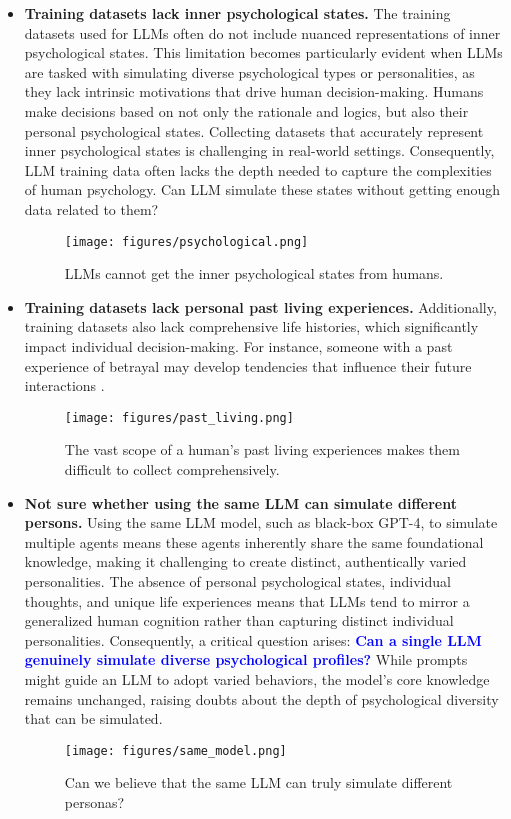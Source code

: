 \begin{itemize}
\item \textbf{Training datasets lack inner psychological states.} The training datasets used for LLMs often do not include nuanced representations of inner psychological states. This limitation becomes particularly evident when LLMs are tasked with simulating diverse psychological types or personalities, as they lack intrinsic motivations that drive human decision-making. Humans make decisions based on not only the rationale and logics, but also their personal psychological states. Collecting datasets that accurately represent inner psychological states is challenging in real-world settings. Consequently, LLM training data often lacks the depth needed to capture the complexities of human psychology. Can LLM simulate these states without getting enough data related to them?

\begin{figure}[htbp]
\centering
\texttt{[image: figures/psychological.png]}
\caption{LLMs cannot get the inner psychological states from humans.}
\label{fig:psych}
\end{figure}

\item \textbf{Training datasets lack personal past living experiences.} Additionally, training datasets also lack comprehensive life histories, which significantly impact individual decision-making. For instance, someone with a past experience of betrayal may develop tendencies that influence their future interactions \citep{finkel2002dealing}. 

\begin{figure}[htbp]
\centering
\texttt{[image: figures/past\_living.png]}
\caption{The vast scope of a human's past living experiences makes them difficult to collect comprehensively.}
\label{fig:past}
\end{figure}

\item \textbf{Not sure whether using the same LLM can simulate different persons.} Using the same LLM model, such as black-box GPT-4, to simulate multiple agents means these agents inherently share the same foundational knowledge, making it challenging to create distinct, authentically varied personalities. The absence of personal psychological states, individual thoughts, and unique life experiences means that LLMs tend to mirror a generalized human cognition rather than capturing distinct individual personalities. Consequently, a critical question arises: \textcolor{blue}{\textbf{Can a single LLM genuinely simulate diverse psychological profiles?}} While prompts might guide an LLM to adopt varied behaviors, the model’s core knowledge remains unchanged, raising doubts about the depth of psychological diversity that can be simulated.

\begin{figure}[htbp]
\centering
\texttt{[image: figures/same\_model.png]}
\caption{Can we believe that the same LLM can truly simulate different personas?}
\label{fig:same_model}
\end{figure}
\end{itemize}

